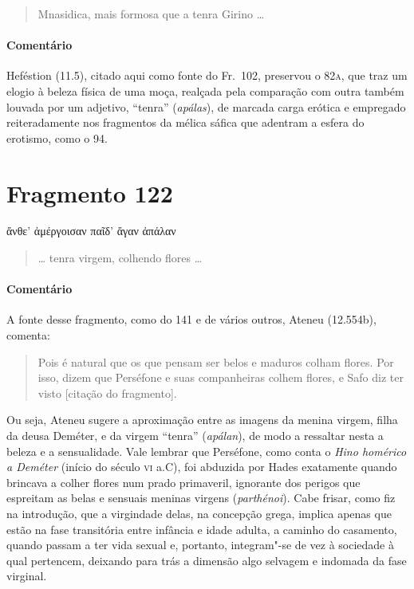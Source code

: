 {\begin{verse}
Mnasidica, mais formosa que a tenra Girino \ldots{}
\end{verse}

{\paragraph{Comentário} Heféstion (11.5), citado aqui como fonte do Fr.~102, preservou o 82\textsc{a}, que traz
um elogio à beleza física de uma moça, realçada pela comparação com outra
também louvada por um adjetivo, ``tenra” (\textit{apálas}), de marcada
carga erótica e empregado reiteradamente nos fragmentos da mélica sáfica que
adentram a esfera do erotismo, como o 94.}

\section{Fragmento 122}

\begin{gkverse}
ἄνθε’ ἀμέργοισαν παῖδ’ ἄγαν ἀπάλαν
\end{gkverse}

\begin{verse}
\ldots{} tenra virgem, colhendo flores \ldots{}
\end{verse}

{\paragraph{Comentário} A fonte desse fragmento, como do 141 e de vários outros, Ateneu (12.554b), comenta: 

\begin{quote}
Pois é natural
que os que pensam ser belos e maduros colham flores. Por isso, dizem que
Perséfone e suas companheiras colhem flores, e Safo diz ter visto 
[citação do fragmento].
\end{quote}

 Ou seja, Ateneu sugere a aproximação entre as imagens
da menina virgem, filha da deusa Deméter, e da virgem ``tenra”
(\textit{apálan}), de modo a ressaltar nesta a beleza e a
sensualidade. Vale lembrar que Perséfone, como conta o \textit{Hino homérico a Deméter} 
(início do século \textsc{vi} a.C), foi abduzida por Hades exatamente
quando brincava a colher flores num prado primaveril, ignorante dos perigos que
espreitam as belas e sensuais meninas virgens (\textit{parthénoi}). Cabe frisar, como fiz na introdução, que a virgindade delas,
na concepção grega, implica
apenas que estão na fase transitória entre infância e idade
adulta, a caminho do casamento, quando passam a ter vida sexual e, portanto, integram"-se
de vez à sociedade à qual pertencem, deixando para trás a dimensão algo
selvagem e indomada da fase virginal.}



}
